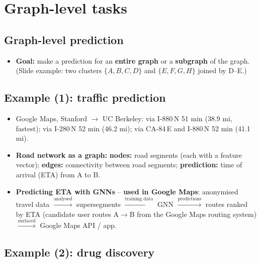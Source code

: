 \section{Graph-level tasks}\label{sec:lec01-graph}

\subsection{Graph-level prediction}\label{sec:lec01-graphpred}

\begin{itemize}
  \item \textbf{Goal:} make a prediction for an \textbf{entire graph} or a \textbf{subgraph}
    of the graph. (Slide example: two clusters $\{A,B,C,D\}$ and $\{E,F,G,H\}$ joined by
    D--E.)
\end{itemize}

\subsection{Example (1): traffic prediction}\label{sec:lec01-traffic}

\begin{itemize}
  \item Google Maps, Stanford $\to$ UC Berkeley: via I-880\,N 51 min (38.9 mi, fastest);
    via I-280\,N 52 min (46.2 mi); via CA-84\,E and I-880\,N 52 min (41.1 mi).
  \item \textbf{Road network as a graph:} \textbf{nodes:} road segments (each with a
    feature vector); \textbf{edges:} connectivity between road segments;
    \textbf{prediction:} time of arrival (ETA) from A to B.
  \item \textbf{Predicting ETA with GNNs} -- \textbf{used in Google Maps}: anonymised travel
    data $\xrightarrow{\text{analysed}}$ supersegments $\xrightarrow{\text{training data}}$
    GNN $\xrightarrow{\text{predictions}}$ routes ranked by ETA (candidate user routes
    A$\to$B from the Google Maps routing system) $\xrightarrow{\text{surfaced}}$ Google
    Maps API / app.
\end{itemize}

\subsection{Example (2): drug discovery}\label{sec:lec01-antibiotics}

